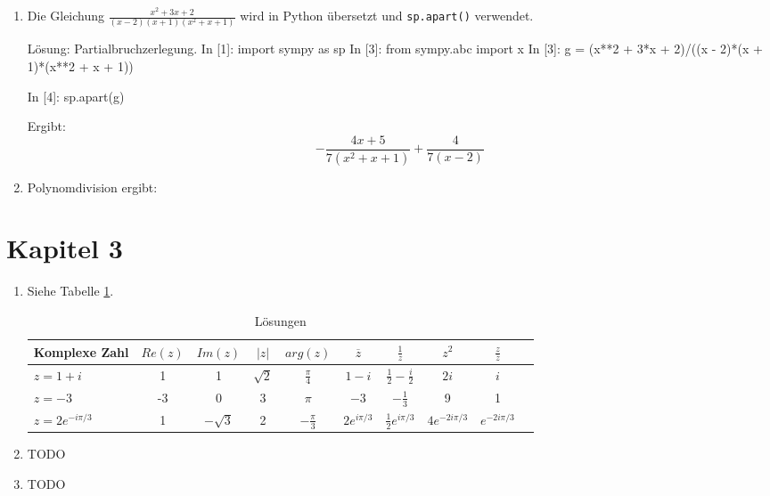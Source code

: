\begin{enumerate}
\item Die Gleichung $ \frac{x^{2} + 3 x + 2}{\left(x - 2\right) \left(x + 1\right) \left(x^{2} + x + 1\right)}$ wird in Python übersetzt und \texttt{sp.apart()} verwendet.
\begin{python}{Lösung: Partialbruchzerlegung.}
In [1]: import sympy as sp
In [3]: from sympy.abc import x
In [3]: g = (x**2 + 3*x + 2)/((x - 2)*(x + 1)*(x**2 + x + 1))

In [4]: sp.apart(g)
\end{python}

Ergibt:
$$- \frac{4 x + 5}{7 \left(x^{2} + x + 1\right)} + \frac{4}{7 \left(x - 2\right)}$$

\item Polynomdivision ergibt: 


\end{enumerate}

\section{Kapitel 3}
\begin{enumerate}
\item Siehe Tabelle \ref{tab:sol_3_1}.

\renewcommand{\arraystretch}{1.5}

\begin{table}[H] 
\centering
\begin{tabular}{|>{\raggedright}m{3cm}|c|c|c|c|c|c|c|c|c|}
\hline
\textbf{Komplexe Zahl} & $Re(z)$ & $Im(z)$ & $|z|$ & $arg(z)$ & $\overline{z}$ & $\frac{1}{z}$ & $z^2$ & $\frac{z}{\overline{z}}$ \\
\hline
$z = 1 + i$ & 1 & 1 & $\sqrt{2}$ & $\frac{\pi}{4}$ & $1 - i$ & $\frac{1}{2} - \frac{i}{2}$ & $2i$ & $i$ \\
\hline
$z = -3$ & -3 & 0 & 3 & $\pi$ & $-3$ & $-\frac{1}{3}$ & 9 & 1 \\
\hline
$z = 2e^{-i\pi/3}$ & 1 & $-\sqrt{3}$ & 2 & $-\frac{\pi}{3}$ & $2e^{i\pi/3}$  & $\frac{1}{2}e^{i\pi/3}$ & $4e^{-2i\pi/3}$ & $e^{-2i\pi/3}$ \\
\hline
\end{tabular}
\caption{Lösungen}
\label{tab:sol_3_1}
\end{table}

\item TODO
\item TODO

\end{enumerate}
